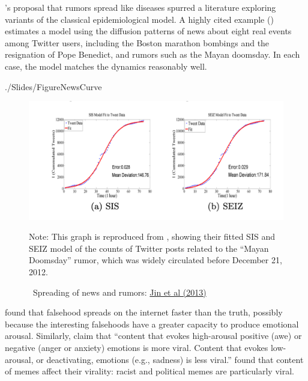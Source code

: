 \cite{daley1964epidemics}'s proposal that rumors spread like diseases spurred a literature exploring variants of the classical epidemiological model.  A highly cited example (\cite{jin2013epidemiological}) 
estimates a model using the diffusion patterns of news about eight real events among Twitter users, including the Boston marathon bombings  and the resignation of Pope Benedict, and rumors such as the Mayan doomsday.  In each case, the model matches the dynamics reasonably well. 

\begin{verbatimwrite}{./Slides/FigureNewsCurve}
  \begin{figure}[!ht] \centering  %
    \caption{ ~Spreading of news and rumors: \href{https://people.cs.vt.edu/ramakris/papers/news-rumor-epi-snakdd13.pdf}{Jin et al (2013)}}\nocite{jin2013epidemiological}
    \label{fig:news_curve}
    \centerline{\includegraphics[width=\textwidth]{./figures/Doomsday}}
    \begin{flushleft}{\footnotesize Note: This graph is reproduced from \cite{jin2013epidemiological}, showing their fitted SIS and SEIZ model of the counts of Twitter posts related to the ``Mayan Doomsday'' rumor, which was widely circulated before December 21, 2012.}
    \end{flushleft}
  \end{figure}
\end{verbatimwrite}%

\href{https://science.sciencemag.org/content/359/6380/1146}{\cite{vosoughi_spread_2018}} found that falsehood spreads on the internet faster than the truth, possibly because the interesting falsehoods have a greater capacity to produce emotional arousal.  Similarly, \href{https://journals.sagepub.com/doi/10.1509/jmr.10.0353}{\cite{berger2012makes}} claim that ``content that evokes high-arousal positive (awe) or negative (anger or anxiety) emotions is more viral. Content that evokes low-arousal, or deactivating, emotions (e.g., sadness) is less viral.'' \href{https://arxiv.org/abs/1805.12512}{\cite{zannettou2018origins}} found that content of memes affect their virality: racist and political memes are particularly viral.

